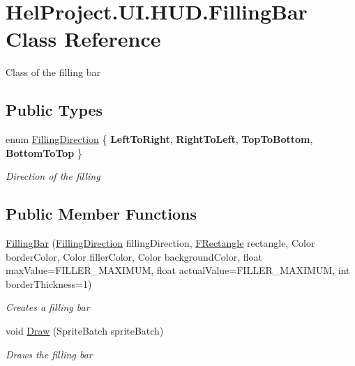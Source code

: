 \hypertarget{class_hel_project_1_1_u_i_1_1_h_u_d_1_1_filling_bar}{}\section{Hel\+Project.\+U\+I.\+H\+U\+D.\+Filling\+Bar Class Reference}
\label{class_hel_project_1_1_u_i_1_1_h_u_d_1_1_filling_bar}


Class of the filling bar  


\subsection*{Public Types}
\begin{DoxyCompactItemize}
\item 
enum \hyperlink{class_hel_project_1_1_u_i_1_1_h_u_d_1_1_filling_bar_a2f19768a47999784b10d84eabca4c86e}{Filling\+Direction} \{ {\bfseries Left\+To\+Right}, 
{\bfseries Right\+To\+Left}, 
{\bfseries Top\+To\+Bottom}, 
{\bfseries Bottom\+To\+Top}
 \}
\begin{DoxyCompactList}\small\item\em Direction of the filling \end{DoxyCompactList}\end{DoxyCompactItemize}
\subsection*{Public Member Functions}
\begin{DoxyCompactItemize}
\item 
\hyperlink{class_hel_project_1_1_u_i_1_1_h_u_d_1_1_filling_bar_a6e9cedf8a6f68684989e44f8e12eb25f}{Filling\+Bar} (\hyperlink{class_hel_project_1_1_u_i_1_1_h_u_d_1_1_filling_bar_a2f19768a47999784b10d84eabca4c86e}{Filling\+Direction} filling\+Direction, \hyperlink{class_hel_project_1_1_tools_1_1_f_rectangle}{F\+Rectangle} rectangle, Color border\+Color, Color filler\+Color, Color background\+Color, float max\+Value=F\+I\+L\+L\+E\+R\+\_\+\+M\+A\+X\+I\+M\+U\+M, float actual\+Value=F\+I\+L\+L\+E\+R\+\_\+\+M\+A\+X\+I\+M\+U\+M, int border\+Thickness=1)
\begin{DoxyCompactList}\small\item\em Creates a filling bar \end{DoxyCompactList}\item 
void \hyperlink{class_hel_project_1_1_u_i_1_1_h_u_d_1_1_filling_bar_a7a9b3a6a4bc7bda2149b33d8a13d1a14}{Draw} (Sprite\+Batch sprite\+Batch)
\begin{DoxyCompactList}\small\item\em Draws the filling bar \end{DoxyCompactList}\end{DoxyCompactItemize}
